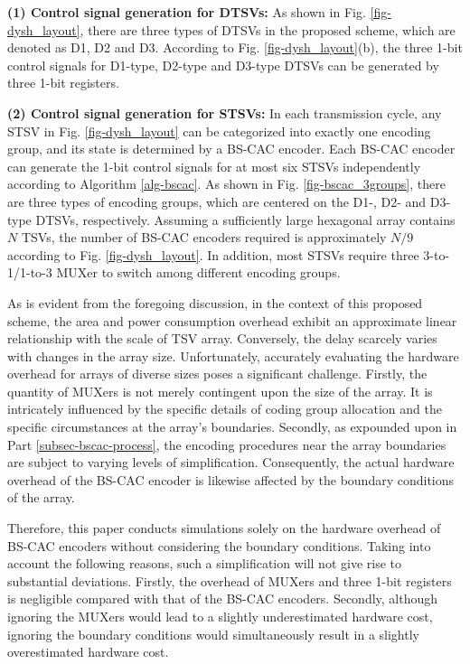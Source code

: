 \documentclass[lettersize,journal]{IEEEtran}
\begin{document}
{\bf (1) Control signal generation for DTSVs:} As shown in Fig. \ref{fig-dysh_layout}, there are three types of DTSVs in the proposed scheme, which are denoted as D1, D2 and D3. According to Fig. \ref{fig-dysh_layout}(b), the three 1-bit control signals for D1-type, D2-type and D3-type DTSVs can be generated by three 1-bit registers.


{\bf (2) Control signal generation for STSVs:} In each transmission cycle, any STSV in Fig. \ref{fig-dysh_layout} can be categorized into exactly one encoding group, and its state is determined by a BS-CAC encoder. Each BS-CAC encoder can generate the 1-bit control signals for at most six STSVs independently according to Algorithm \ref{alg-bscac}. As shown in Fig. \ref{fig-bscac_3groups}, there are three types of encoding groups, which are centered on the D1-, D2- and D3-type DTSVs, respectively. Assuming a sufficiently large hexagonal array contains $N$ TSVs, the number of BS-CAC encoders required is approximately $N/9$ according to Fig. \ref{fig-dysh_layout}. In addition, most STSVs require three 3-to-1/1-to-3 MUXer to switch among different encoding groups.

As is evident from the foregoing discussion, in the context of this proposed scheme, the area and power consumption overhead exhibit an approximate linear relationship with the scale of TSV array. Conversely, the delay scarcely varies with changes in the array size. Unfortunately, accurately evaluating the hardware overhead for arrays of diverse sizes poses a significant challenge. Firstly, the quantity of MUXers is not merely contingent upon the size of the array. It is intricately influenced by the specific details of coding group allocation and the specific circumstances at the array's boundaries. Secondly, as expounded upon in Part \ref{subsec-bscac-process}, the encoding procedures near the array boundaries are subject to varying levels of simplification. Consequently, the actual hardware overhead of the BS-CAC encoder is likewise affected by the boundary conditions of the array.

Therefore, this paper conducts simulations solely on the hardware overhead of BS-CAC encoders without considering the boundary conditions. Taking into account the following reasons, such a simplification will not give rise to substantial deviations. Firstly, the overhead of MUXers and three 1-bit registers is negligible compared with that of the BS-CAC encoders. Secondly, although ignoring the MUXers would lead to a slightly underestimated hardware cost, ignoring the boundary conditions would simultaneously result in a slightly overestimated hardware cost.
\end{document}
